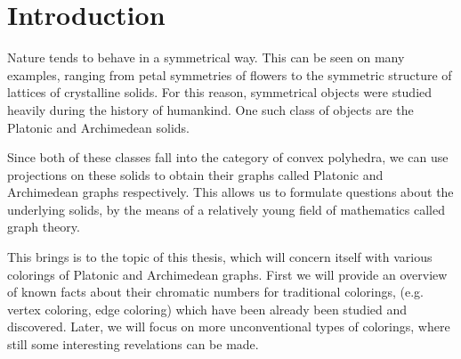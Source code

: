 \chapter*{Introduction}

Nature tends to behave in a symmetrical way. This can be seen on many examples, ranging from petal symmetries of flowers to the symmetric structure of lattices of crystalline solids. For this reason, symmetrical objects were studied heavily during the history of humankind. One such class of objects are the Platonic and Archimedean solids.

Since both of these classes fall into the category of convex polyhedra, we can use projections on these solids to obtain their graphs called Platonic and Archimedean graphs respectively. This allows us to formulate questions about the underlying solids, by the means of a relatively young field of mathematics called graph theory.

This brings is to the topic of this thesis, which will concern itself with various colorings of Platonic and Archimedean graphs. First we will provide an overview of known facts about their chromatic numbers for traditional colorings, (e.g. vertex coloring, edge coloring) which have been already been studied and discovered. Later, we will focus on more unconventional types of colorings, where still some interesting revelations can be made.